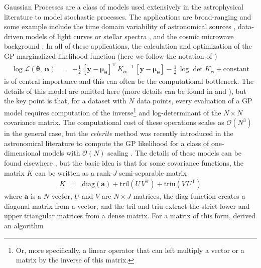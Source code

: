 \documentclass[rnaas]{aastex62}
\newcommand{\eqlabel}[1]{\label{eq:#1}}
\newcommand{\T}{\ensuremath{\mathrm{T}}}
\newcommand{\bvec}[1]{{\ensuremath{\boldsymbol{#1}}}}
\begin{document}
Gaussian Processes \citep[GPs][]{Rasmussen:2006} are a class of models used
extensively in the astrophysical literature to model stochastic processes.
The applications are broad-ranging and some example include the time domain
variability of astronomical sources \citep{Brewer:2009, Kelly:2014,
Haywood:2014, Rajpaul:2015, Foreman-Mackey:2017}, data-driven models of light
curves or stellar spectra \citep{Wang:2012, Luger:2016, Czekala:2017}, and the
cosmic microwave background \citep{Bond:1987,Wandelt:2003}.
In all of these applications, the calculation and optimization of the GP
marginalized likelihood function (here we follow the notation of
\citealt{Foreman-Mackey:2017})
\begin{eqnarray}\eqlabel{loglike}
\log \mathcal{L}(\bvec{\theta},\,\bvec{\alpha}) &=&
    -\frac{1}{2}\,\left[\bvec{y} - \bvec{\mu}_\bvec{\theta}\right]^\T\,
        {K_\bvec{\alpha}}^{-1}\,\left[\bvec{y}-\bvec{\mu}_\bvec{\theta}\right]
    -\frac{1}{2}\,\log\det K_\bvec{\alpha} + \mathrm{constant}
\end{eqnarray}
is of central importance and this can often be the computational bottleneck.
The details of this model are omitted here (more details can be found in
\citealt{Rasmussen:2006} and \citealt{Foreman-Mackey:2017}), but the key point
is that, for a dataset with $N$ data points, every evaluation of a GP model
requires computation of the inverse\footnote{Or, more specifically, a linear
operator that can left multiply a vector or a matrix by the inverse of this
matrix.} and log-determinant of the $N \times N$ covariance matrix.
The computational cost of these operations scales as $\mathcal{O}(N^3)$ in the
general case, but the \emph{celerite} method was recently introduced in the
astronomical literature to compute the GP likelihood for a class of
one-dimensional models with $\mathcal{O}(N)$ scaling
\citep{Foreman-Mackey:2017}.
The details of these models can be found elsewhere
\citep{Foreman-Mackey:2017}, but the basic idea is that for some covariance
functions, the matrix $K$ can be written as a rank-$J$ semi-separable matrix
\begin{eqnarray}\eqlabel{semi-K}
K &=& \mathrm{diag}(\bvec{a}) + \mathrm{tril}(U\,{V}^\T) +
    \mathrm{triu}({V}\,{U}^\T)
\end{eqnarray}
where $\bvec{a}$ is a $N$-vector, ${U}$ and ${V}$ are $N \times J$
matrices, the diag function creates a diagonal matrix from a vector, and the
tril and triu extract the strict lower and upper triangular matrices from a
dense matrix.
For a matrix of this form, \citet{Foreman-Mackey:2017} derived an algorithm
\end{document}
